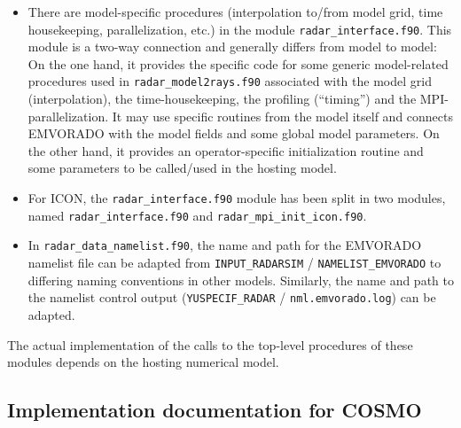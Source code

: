 \documentclass[10pt,a4paper,twoside,headinclude,footinclude,parskip=half]{scrartcl}
\newcommand{\myaktuellesection}{sec:intro}%
\newcommand{\labelsec}[1]{\label{#1}\renewcommand{\myaktuellesection}{#1}}%
\newcommand{\labelsec}[1]{\label{#1}}%
\newcommand{\srcform}[1]{\mbox{\texttt{#1}}\xspace}%
\begin{document}
\begin{itemize}
\item There are model-specific procedures (interpolation to/from model grid, time housekeeping, parallelization, etc.)
  in the module \srcform{radar_interface.f90}.
  This module is a two-way connection and generally differs from model to model:
  On the one hand, it provides the specific code for some generic
  model-related procedures used in \srcform{radar_model2rays.f90} associated with the model grid (interpolation),
  the time-housekeeping, the profiling (``timing'') and the MPI-parallelization.
  It may use specific routines from the model itself and connects EMVORADO with the model fields and some global model parameters.
  On the other hand, it provides an operator-specific initialization routine and some parameters to be called/used
  in the hosting model.
\item For ICON, the \srcform{radar_interface.f90} module has been split in two modules, named \srcform{radar_interface.f90} and \srcform{radar_mpi_init_icon.f90}.
\item In \srcform{radar_data_namelist.f90}, the name and path for the EMVORADO namelist file can be adapted from \srcform{INPUT_RADARSIM} / \srcform{NAMELIST_EMVORADO} to
  differing naming conventions in other models. Similarly, the name and path to the namelist control output (\srcform{YUSPECIF_RADAR} / \srcform{nml.emvorado.log}) can be adapted.
\end{itemize}
The actual implementation of the calls to the top-level procedures of these modules depends on the hosting numerical model.


\newpage

\subsection{Implementation documentation for COSMO}

\labelsec{sec:implcosmo}
\end{document}
